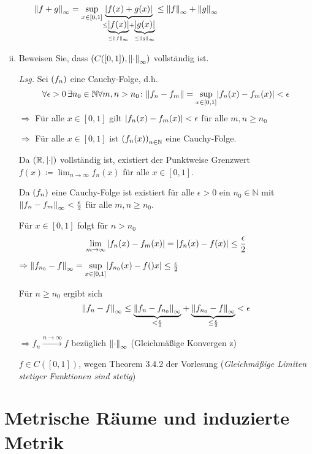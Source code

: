 \documentclass{article}
\begin{document}
\begin{enumerate}[(i)]
\begin{itemize}
    $\norm{f + g}_{\infty} = \underset{x \in [0, 1]}{\sup}
    \underset{\leq \underset{\leq \norm{f}_{\infty}}{\underbrace{\abs{f(x)}}} +
      \underset{\leq \norm{g}_{\infty}}{\underbrace{\abs{g(x)}}}}
    {\underbrace{\abs{f(x) + g(x)}}}
    \leq \norm{f}_{\infty} + \norm{g}_{\infty}$
  \end{itemize}

\item Beweisen Sie, dass $(C([0, 1]), \norm{\cdot}_{\infty})$ vollständig ist.

  \textit{Lsg.} Sei $\qty(f_n)$ eine Cauchy-Folge, d.h.
  \[
    \forall \epsilon > 0 \,\exists n_0 \in \mathbb{N} \forall m, n > n_0 \colon \norm{f_n - f_m}
    = \underset{x \in [0, 1]}{\sup} \abs{f_n(x) - f_m(x)} < \epsilon
  \]
  $\Rightarrow$ Für alle $x \in [0, 1]$ gilt $\abs{f_n(x) - f_m(x)} < \epsilon$ für alle $m, n \geq n_0$

  $\Rightarrow$ Für alle $x \in [0, 1]$ ist $\qty(f_n(x))_{n \in \mathbb{N}}$ eine Cauchy-Folge.

  Da $(\mathbb{R}, \abs{\cdot})$ vollständig ist, existiert der Punktweise Grenzwert
  $f(x) \coloneqq \lim_{n \to \infty} f_n(x)$ für alle $x \in [0, 1]$.

  Da $\qty(f_n)$ eine Cauchy-Folge ist existiert für alle $\epsilon > 0$ ein $n_0 \in \mathbb{N}$
  mit $\norm{f_n - f_m}_{\infty} < \frac{\epsilon}{2}$ für alle $m, n \geq n_0$.

  Für $x \in [0, 1]$ folgt für $n > n_0$
  \[
    \lim_{m \to \infty} \abs{f_n(x) - f_m(x)} = \abs{f_n(x) - f(x)} \leq \frac{\epsilon}{2}
  \]

  $\Rightarrow \norm{f_{n_0} - f}_{\infty} =
  \underset{x \in [0, 1]}{\sup} \abs{f_{n_0} (x) - f()x}
  \leq \frac{\epsilon}{2}$

  Für $n \geq n_0$ ergibt sich
  \[
    \norm{f_n - f}_{\infty} \leq \underset{< \frac{\epsilon}{2}}{\underbrace{\norm{f_n - f_{n_0}}_{\infty}}} +
    \underset{\leq \frac{\epsilon}{2}}{\underbrace{\norm{f_{n_0} - f}_{\infty}}} < \epsilon
  \]

  $\Rightarrow f_n \overset{n \to \infty}{\longrightarrow} f$ bezüglich $\norm{\cdot}_{\infty}$ (Gleichmäßige Konvergen z)

  $f \in C([0, 1])$, wegen Theorem 3.4.2 der Vorlesung (\textit{Gleichmäßige Limiten stetiger Funktionen sind stetig})
\end{enumerate}

\section*{Metrische Räume und induzierte Metrik}
\end{document}
